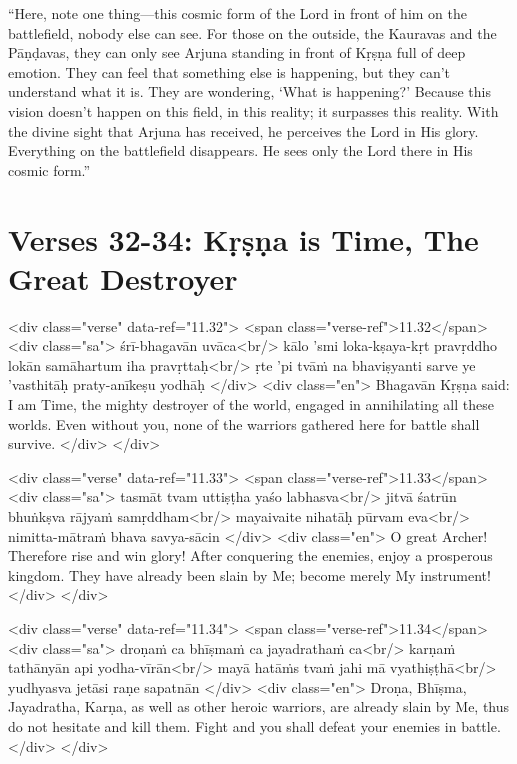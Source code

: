 \enquote{Here, note one thing---this cosmic form of the Lord in front of him on the battlefield, nobody else can see. For those on the outside, the Kauravas and the Pāṇḍavas, they can only see Arjuna standing in front of Kṛṣṇa full of deep emotion. They can feel that something else is happening, but they can’t understand what it is. They are wondering, \enquote{What is happening?} Because this vision doesn’t happen on this field, in this reality; it surpasses this reality. With the divine sight that Arjuna has received, he perceives the Lord in His glory. Everything on the battlefield disappears. He sees only the Lord there in His cosmic form.}

\section{Verses 32-34: Kṛṣṇa is Time, The Great Destroyer}\label{sec-verses-32-34-krsna-is-time-the-great-destroyer}


\begin{html}
<div class="verse" data-ref="11.32">
  <span class="verse-ref">11.32</span>
  <div class="sa">
    śrī-bhagavān uvāca<br/>
    kālo ’smi loka-kṣaya-kṛt pravṛddho lokān samāhartum iha pravṛttaḥ<br/>
    ṛte ’pi tvāṁ na bhaviṣyanti sarve ye ’vasthitāḥ praty-anīkeṣu yodhāḥ
  </div>
  <div class="en">
    \hspace*{1em}Bhagavān Kṛṣṇa said: \\ I am Time, the mighty destroyer of the world, engaged in annihilating all these worlds. Even without you, none of the warriors gathered here for battle shall survive.
  </div>
</div>
\end{html}



\begin{html}
<div class="verse" data-ref="11.33">
  <span class="verse-ref">11.33</span>
  <div class="sa">
    tasmāt tvam uttiṣṭha yaśo labhasva<br/>
    jitvā śatrūn bhuṅkṣva rājyaṁ samṛddham<br/>
    mayaivaite nihatāḥ pūrvam eva<br/>
    nimitta-mātraṁ bhava savya-sācin
  </div>
  <div class="en">
    O great Archer! Therefore rise and win glory! After conquering the enemies, enjoy a prosperous kingdom. They have already been slain by Me; become merely My instrument!
  </div>
</div>
\end{html}



\begin{html}
<div class="verse" data-ref="11.34">
  <span class="verse-ref">11.34</span>
  <div class="sa">
    droṇaṁ ca bhīṣmaṁ ca jayadrathaṁ ca<br/>
    karṇaṁ tathānyān api yodha-vīrān<br/>
    mayā hatāṁs tvaṁ jahi mā vyathiṣṭhā<br/>
    yudhyasva jetāsi raṇe sapatnān
  </div>
  <div class="en">
    Droṇa, Bhīṣma, Jayadratha, Karṇa, as well as other heroic warriors, are already slain by Me, thus do not hesitate and kill them. Fight and you shall defeat your enemies in battle.
  </div>
</div>
\end{html}


